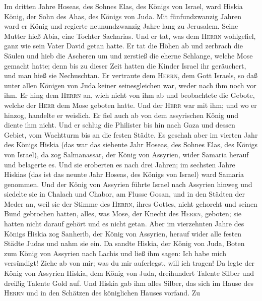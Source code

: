  Im dritten Jahre Hoseas, des Sohnes Elas, des Königs von
Israel, ward Hiskia König, der Sohn des Ahas, des Königs von Juda.
 Mit fünfundzwanzig Jahren ward er König und regierte
neunundzwanzig Jahre lang zu Jerusalem. Seine Mutter hieß Abia, eine
Tochter Sacharias.  Und er tat, was dem \textsc{Herrn}
wohlgefiel, ganz wie sein Vater David getan hatte.  Er tat
die Höhen ab und zerbrach die Säulen und hieb die Ascheren um und
zerstieß die eherne Schlange, welche Mose gemacht hatte; denn bis zu
dieser Zeit hatten die Kinder Israel ihr geräuchert, und man hieß sie
Nechuschtan.  Er vertraute dem \textsc{Herrn}, dem Gott
Israels, so daß unter allen Königen von Juda keiner seinesgleichen war,
weder nach ihm noch vor ihm.  Er hing dem \textsc{Herrn}
an, wich nicht von ihm ab und beobachtete die Gebote, welche der
\textsc{Herr} dem Mose geboten hatte.  Und der
\textsc{Herr} war mit ihm; und wo er hinzog, handelte er weislich. Er
fiel auch ab von dem assyrischen König und diente ihm nicht.
 Und er schlug die Philister bis hin nach Gaza und dessen
Gebiet, vom Wachtturm bis an die festen Städte.  Es
geschah aber im vierten Jahr des Königs Hiskia (das war das siebente
Jahr Hoseas, des Sohnes Elas, des Königs von Israel), da zog
Salmanassar, der König von Assyrien, wider Samaria herauf und belagerte
es.  Und sie eroberten es nach drei Jahren; im sechsten
Jahre Hiskias (das ist das neunte Jahr Hoseas, des Königs von Israel)
ward Samaria genommen.  Und der König von Assyrien führte
Israel nach Assyrien hinweg und siedelte sie in Chalach und Chabor, am
Flusse Gosan, und in den Städten der Meder an,  weil sie
der Stimme des \textsc{Herrn}, ihres Gottes, nicht gehorcht und seinen
Bund gebrochen hatten, alles, was Mose, der Knecht des \textsc{Herrn},
geboten; sie hatten nicht darauf gehört und es nicht getan.
 Aber im vierzehnten Jahre des Königs Hiskia zog
Sanherib, der König von Assyrien, herauf wider alle festen Städte Judas
und nahm sie ein.  Da sandte Hiskia, der König von Juda,
Boten zum König von Assyrien nach Lachis und ließ ihm sagen: Ich habe
mich versündigt! Ziehe ab von mir; was du mir auferlegst, will ich
tragen! Da legte der König von Assyrien Hiskia, dem König von Juda,
dreihundert Talente Silber und dreißig Talente Gold auf. 
Und Hiskia gab ihm alles Silber, das sich im Hause des \textsc{Herrn}
und in den Schätzen des königlichen Hauses vorfand.  Zu
